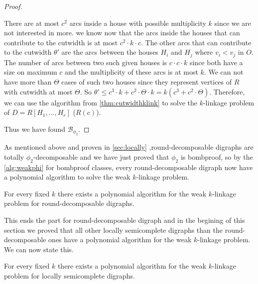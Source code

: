 \begin{proof}
\begin{itemize}
        There are at most $c^2$ arcs inside a house with possible multiplicity $k$ since we are not interested in more. 
        we know now that the arcs inside the houses that can contribute to the cutwidth is at most $c^2\cdot k\cdot c$.
        The other arcs that can contribute to the cutwidth $\theta'$ are the arcs between the houses $H_i$ and $H_j$ where $v_i<v_j$ in $O$. 
        The number of arcs between two such given houses is $c\cdot c\cdot k$ since both have a size on maximum $c$ and the multiplicity of these arcs is at most $k$. 
        We can not have more than $\Theta$ cases of such two houses since they represent vertices of $R$ with cutwidth at most $\Theta$.
        So $\theta'\leq c^3\cdot k+c^2\cdot \Theta \cdot k=k(c^3+c^2\cdot \Theta)$.
        Therefore, we can use the algorithm from \autoref{thm:cutwidthklink} to solve the $k$-linkage problem of $D=R[H_1,\dots ,H_r]$ ($R(c)$).
    \end{itemize}
    Thus we have found $\mathcal{B}_{\phi_2}$.
\end{proof}
As mentioned above and proven in \autoref{sec:locally} ,round-decomposable digraphs are totally $\phi_2$-decomposable and we have just proved that $\phi_2$ is bombproof, so by the \autoref{alg:weakphi} for bombproof classes, every round-decomposable digraph now have a polynomial algorithm to solve the weak $k$-linkage problem.
\begin{thm}
    For every fixed $k$ there exists a polynomial algorithm for the weak $k$-linkage problem for round-decomposable digraphs.
\end{thm}
This ends the part for round-decomposable digraph and in the begining of this section we proved that all other locally semicomplete digraphs than the round-decomposable ones have a polynomial algorithm for the weak $k$-linkage problem. We can now state this.
\begin{thm}
    For every fixed $k$ there exists a polynomial algorithm for the weak $k$-linkage problem for locally semicomplete digraphs.
\end{thm}